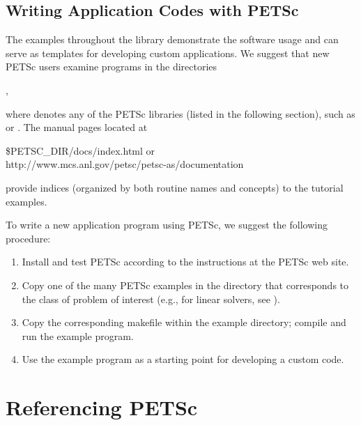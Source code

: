 \subsection*{Writing Application Codes with PETSc}

The examples throughout the library demonstrate the software usage
and can serve as templates for developing
custom applications.  We suggest that new PETSc
users examine programs in the directories 
\begin{tabbing}
  ,
\end{tabbing}
where 
denotes any of the PETSc libraries (listed in the following
section), such as  or .  
The manual pages located at
\begin{tabbing}
   \${PETSC\_DIR}/docs/index.html or \\
   http://www.mcs.anl.gov/petsc/petsc-as/documentation
\end{tabbing}
provide indices (organized by both routine names and concepts) to the tutorial examples.

To write a new application program using PETSc, we suggest the
following procedure:
\begin{enumerate}
\item Install and test PETSc according to the instructions at the PETSc web site.
\item Copy one of the many PETSc examples in the directory
      that corresponds to the class of problem of interest (e.g.,
      for linear solvers, see ).
\item Copy the corresponding makefile within the example directory;
      compile and run the example program.
\item Use the example program as a starting point for developing a custom code.
\end{enumerate}


\section{Referencing PETSc}

